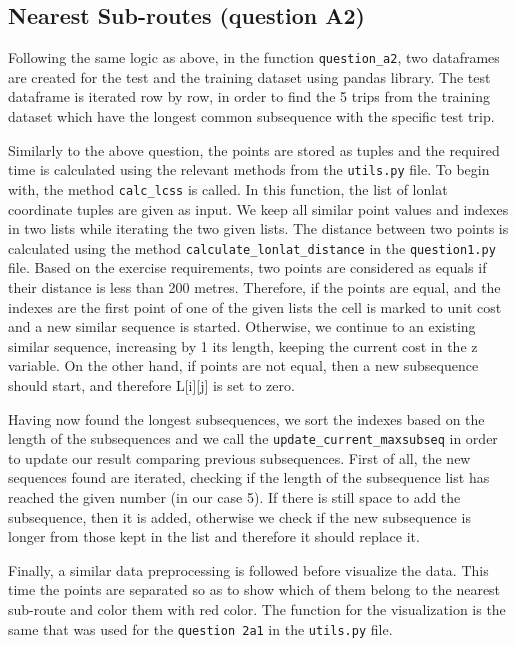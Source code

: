 \documentclass[12pt]{article}
\begin{document}
	\subsection{Nearest Sub-routes (question A2)}
	Following the same logic as above, in the function \texttt{question\_a2}, two dataframes are created for the test and the training dataset using pandas library. The test dataframe is iterated row by row, in order to find the 5 trips from the training dataset which have the longest common subsequence with the specific test trip.
	
	Similarly to the above question, the points are stored as tuples and the required time is calculated using the relevant methods from the \texttt{utils.py} file. To begin with, the method \texttt{calc\_lcss} is called. In this function, the list of lonlat coordinate tuples are given as input. We keep all similar point values and indexes in two lists while iterating the two given lists. The distance between two points is calculated using the method \texttt{calculate\_lonlat\_distance} in the \texttt{question1.py} file. Based on the exercise requirements, two points are considered as equals if their distance is less than 200 metres. Therefore, if the points are equal, and the indexes are the first point of one of the given lists the cell is marked to unit cost and a new similar sequence is started. Otherwise, we continue to an existing similar sequence, increasing by 1 its length, keeping the current cost in the z variable. On the other hand, if points are not equal, then a new subsequence should start, and therefore L[i][j] is set to zero.
	
	Having now found the longest subsequences, we sort the indexes based on the length of the subsequences and we call the \texttt{update\_current\_maxsubseq} in order to update our result comparing previous subsequences. First of all, the new sequences found are iterated, checking if the length of the subsequence list has reached the given number (in our case 5). If there is still space to add the subsequence, then it is added, otherwise we check if the new subsequence is longer from those kept in the list and therefore it should replace it.
	
	Finally, a similar data preprocessing is followed before visualize the data. This time the points are separated so as to show which of them belong to the nearest sub-route and color them with red color. The function for the visualization is the same that was used for the \texttt{question 2a1} in the \texttt{utils.py} file.
	
\end{document}
